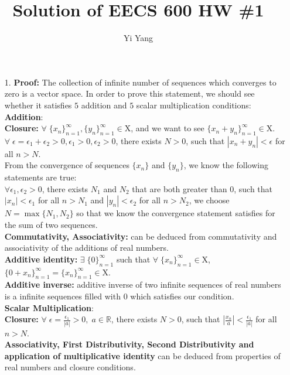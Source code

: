 \documentclass[letterpaper]{article}
\author{Yi Yang}
\title{Solution of EECS 600 HW \#1}
\begin{document}
\date{}
\maketitle

\newcommand{\trace}{\mathrm{trace}}
\newcommand{\real}{\mathbb R}  %
\newcommand{\nat}{\mathbb N}   %
\newcommand{\cp}{\mathbb C}    %
\newcommand{\ds}{\displaystyle}
\newcommand{\mf}[2]{\frac{\ds #1}{\ds #2}}
\newcommand{\spanof}[1]{\textrm{span} \{ #1 \}}
\newcommand{\sol}[0]{\textbf{Solution: }}
\newcommand{\pf}[0]{\textbf{Proof: }}
\newcommand{\rme}[0]{\textrm{e}}
\newcommand{\Null}[1]{\textrm{Null}\{#1\}}
\parindent 0pt

\begin{enumerate}
	\item[1.]\pf
	The collection of infinite number of sequences which converges to zero is a vector space. In order to prove this statement, we should see whether it satisfies $5$ addition and $5$ scalar multiplication conditions:\\
	\large{\textbf{Addition}}:\\
	\textbf{Closure: }$\forall\;\{x_n\}_{n=1}^\infty, \{y_n\}_{n=1}^\infty\in \textrm{X}$, and we want to see $\{x_n + y_n\}_{n=1}^\infty\in\textrm{X}$\;.\\
	$\forall\;\epsilon = \epsilon_{1}+\epsilon_{2} > 0, \epsilon_{1}>0, \epsilon_{2}>0$, there exists $N>0$, such that $|x_n + y_n|<\epsilon$ for all $n>N$\;.\\
	From the convergence of sequences $\{x_n\}$ and $\{y_n\}$, we know the following statements are true:\\
	$\forall \epsilon_{1}, \epsilon_{2} > 0$, there exists $N_{1}$ and $N_{2}$ that are both greater than $0$, such that $|x_n|<\epsilon_{1}$ for all $n > N_{1}$ and $|y_n|<\epsilon_{2}$ for all $n>N_{2}$, we choose $N=\max\{N_{1},N_{2}\}$ so that we know the convergence statement satisfies for the sum of two sequences\;.\\
	\textbf{Commutativity, Associativity: } can be deduced from commutativity and associativity of the additions of real numbers\;.\\
	\textbf{Additive identity: } $\exists\;\{0\}_{n=1}^{\infty}$ such that $\forall\;\{x_n\}_{n=1}^{\infty}\in\textrm{X}$, $\{0+x_n\}_{n=1}^{\infty}=\{x_n\}_{n=1}^{\infty}\in\textrm{X}$\;.\\
	\textbf{Additive inverse: } additive inverse of two infinite sequences of real numbers is a infinite sequences filled with $0$ which satisfies our condition\;.\\
	\large{\textbf{Scalar Multiplication}}:\\
	\textbf{Closure: } $\forall\;\epsilon=\mf{\epsilon_{1}}{|a|}>0,\;a\in\real$, there exists $N>0$, such that $|\mf{x_n}{a}|<\mf{\epsilon_{1}}{|a|}$ for all $n>N$\;.\\ 
	\textbf{Associativity, First Distributivity, Second Distributivity and application of multiplicative identity} can be deduced from properties of real numbers and closure conditions.\\
	

\end{enumerate}
\end{document}
